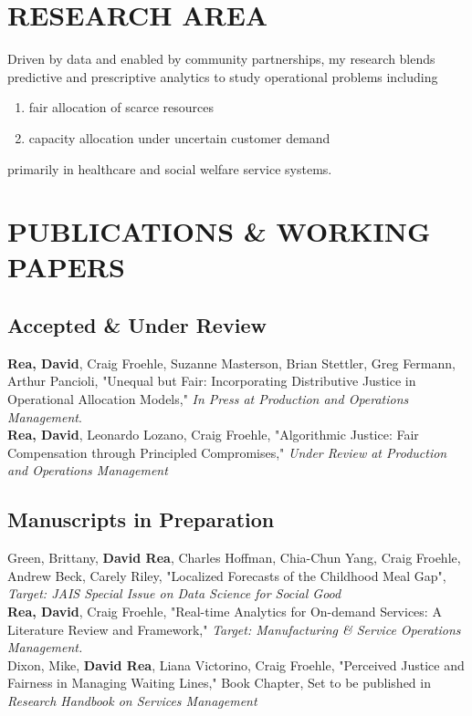 \documentclass[12pt, letter]{moderncv}
\begin{document}
\smallskip
\section{RESEARCH AREA}
\smallskip
Driven by data and enabled by community partnerships, my research blends predictive and prescriptive analytics to study operational problems including
\smallskip 
\begin{enumerate}[\hspace{0.5cm}(1)]
	\item fair allocation of scarce resources 
	\item capacity allocation under uncertain customer demand
\end{enumerate}
primarily in healthcare and social welfare service systems.
\smallskip
\section{PUBLICATIONS \& WORKING PAPERS}
\smallskip
\subsection{Accepted \& Under Review}
\smallskip
\textbf{Rea, David}, Craig Froehle, Suzanne Masterson, Brian Stettler, Greg Fermann, Arthur Pancioli, "Unequal but Fair: Incorporating Distributive Justice in Operational Allocation Models," \textit{In Press at Production and Operations Management}.
\medskip\\ 
\textbf{Rea, David}, Leonardo Lozano, Craig Froehle,  "Algorithmic Justice: Fair Compensation through Principled Compromises," \textit{Under Review at Production and Operations Management}
\subsection{Manuscripts in Preparation}
Green, Brittany, \textbf{David Rea}, Charles Hoffman, Chia-Chun Yang, Craig Froehle, Andrew Beck, Carely Riley, "Localized Forecasts of the Childhood Meal Gap", \textit{Target: JAIS Special Issue on Data Science for Social Good}
\medskip \\
%
\textbf{Rea, David}, Craig Froehle, "Real-time Analytics for On-demand Services: A Literature Review and Framework," \textit{Target: Manufacturing \& Service Operations Management.}
\medskip\\
Dixon, Mike, \textbf{David Rea}, Liana Victorino, Craig Froehle, "Perceived Justice and Fairness in Managing Waiting Lines," Book Chapter, Set to be published in \textit{Research Handbook on Services Management}
\end{document}
